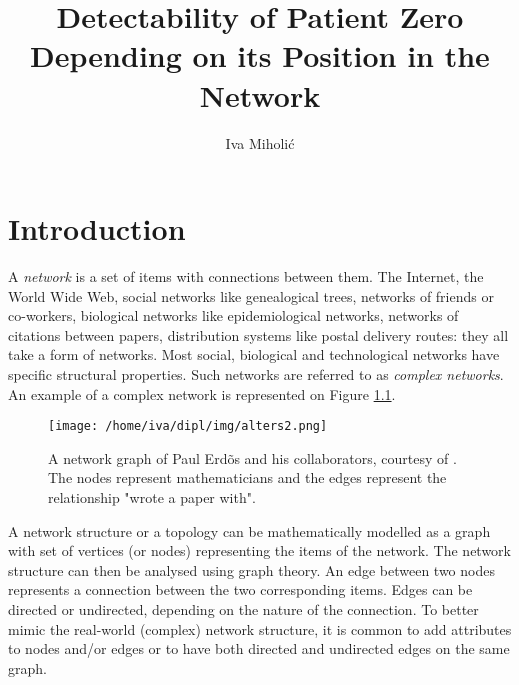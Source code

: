 \documentclass[times, utf8, diplomski]{fer}
\begin{document}


\title{Detectability of Patient Zero Depending on its Position in the Network}

\author{Iva Miholić}

\maketitle

\izvornik

\zahvala{}

\tableofcontents
\listoffigures
\listofalgorithms

\chapter{Introduction}

A \emph{network} is a set of items with connections between them. The Internet, the World Wide Web, social networks like genealogical trees, networks of friends or co-workers, biological networks like epidemiological networks, networks of citations between papers, distribution systems like postal delivery routes: they all take a form of networks. Most social, biological and technological networks have specific structural properties. Such networks are referred to as \emph{complex networks}.  An example of a complex network is represented on Figure \ref{net}.

\begin{figure}[htp]
\centering
\texttt{[image: /home/iva/dipl/img/alters2.png]}
\caption{A network graph of Paul Erd\~os and his collaborators, courtesy of \citet{krebs}. The nodes represent mathematicians and the edges represent the relationship "wrote a paper with".}
\label{net}
\end{figure}
A network structure or a topology can be mathematically modelled as a graph with set of vertices (or nodes) representing the items of the network. The network structure can then be analysed using graph theory. An edge between two nodes represents a connection between the two corresponding items. Edges can be directed or undirected, depending  on the nature of the connection.  To better mimic the real-world (complex) network structure, it is common to add attributes to nodes and/or edges or to have both directed and undirected edges on the same graph.
\end{document}
